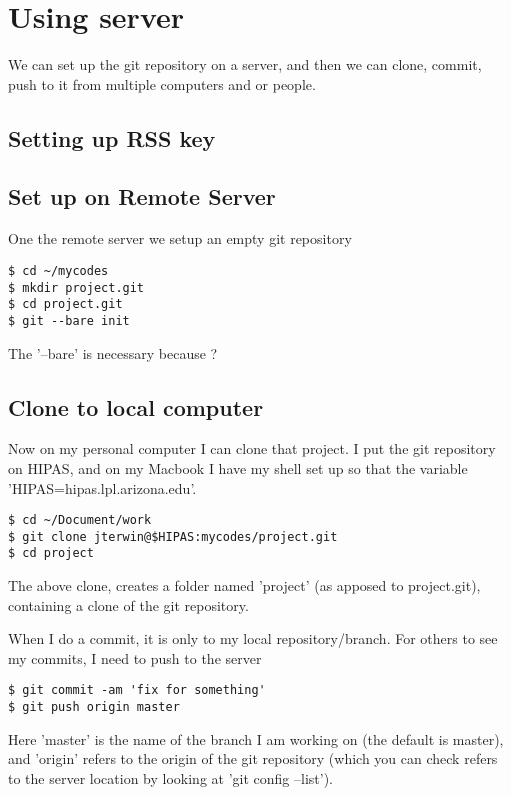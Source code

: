 \documentclass[12pt]{article}
\begin{document}
\section{Using server}

We can set up the git repository on a server, and then we can clone, commit, push to it from multiple computers and or people.

\subsection{Setting up RSS key}


\subsection{Set up on Remote Server}
One the remote server we setup an empty git repository
\begin{lstlisting}[style=Bash]
$ cd ~/mycodes
$ mkdir project.git
$ cd project.git
$ git --bare init
\end{lstlisting}

The '--bare' is necessary because ?



\subsection{Clone to local computer}
Now on my personal computer I can clone that project. I put the git repository on HIPAS, and on my Macbook I have my shell set up so that the variable 'HIPAS=hipas.lpl.arizona.edu'.
\begin{lstlisting}[style=Bash]
$ cd ~/Document/work
$ git clone jterwin@$HIPAS:mycodes/project.git
$ cd project
\end{lstlisting}
The above clone, creates a folder named 'project' (as apposed to project.git), containing a clone of the git repository. 

When I do a commit, it is only to my local repository/branch. For others to see my commits, I need to push to the server
\begin{lstlisting}[style=Bash]
$ git commit -am 'fix for something'
$ git push origin master
\end{lstlisting}
Here 'master' is the name of the branch I am working on (the default is master), and 'origin' refers to the origin of the git repository (which you can check refers to the server location by looking at 'git config --list').
\end{document}
